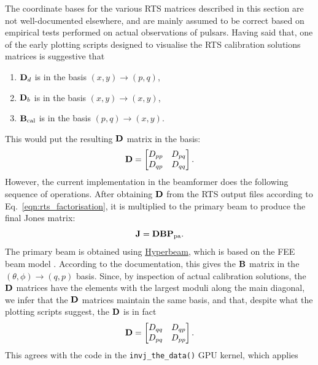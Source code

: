 \documentclass{book}
\newcommand{\pamat}{\ensuremath{{\bf P}_\text{pa}}}
\begin{document}
The coordinate bases for the various RTS matrices described in this section are not well-documented elsewhere, and are mainly assumed to be correct based on empirical tests performed on actual observations of pulsars.
Having said that, one of the early plotting scripts designed to visualise the RTS calibration solutions matrices is suggestive that
\begin{enumerate}
    \item ${\bf D}_d$ is in the basis $(x,y)\rightarrow(p,q)$,
    \item ${\bf D}_b$ is in the basis $(x,y)\rightarrow(x,y)$,
    \item ${\bf B}_\text{cal}$ is in the basis $(p,q)\rightarrow(x,y)$.
\end{enumerate}
This would put the resulting ${\bf D}$ matrix in the basis:
\begin{equation}
    {\bf D} = \begin{bmatrix}
        D_{pp} & D_{pq} \\
        D_{qp} & D_{qq}
    \end{bmatrix}.
\end{equation}
However, the current implementation in the beamformer does the following sequence of operations.
After obtaining ${\bf D}$ from the RTS output files according to Eq.~\eqref{eqn:rts_factorisation}, it is multiplied to the primary beam to produce the final Jones matrix:
\begin{equation}
    {\bf J} = {\bf D}{\bf B}\pamat.
\end{equation}
The primary beam is obtained using \href{https://github.com/MWATelescope/mwa_hyperbeam}{Hyperbeam}, which is based on the FEE beam model \citep{Sokolowski2017}.
According to the documentation, this gives the ${\bf B}$ matrix in the $(\theta,\phi)\rightarrow(q,p)$ basis.
Since, by inspection of actual calibration solutions, the ${\bf D}$ matrices have the elements with the largest moduli along the main diagonal, we infer that the ${\bf D}$ matrices maintain the same basis, and that, despite what the plotting scripts suggest, the ${\bf D}$ is in fact
\begin{equation}
    {\bf D} = \begin{bmatrix}
        D_{qq} & D_{qp} \\
        D_{pq} & D_{pp}
    \end{bmatrix}.
\end{equation}
This agrees with the code in the \texttt{invj\_the\_data()} GPU kernel, which applies
\end{document}
